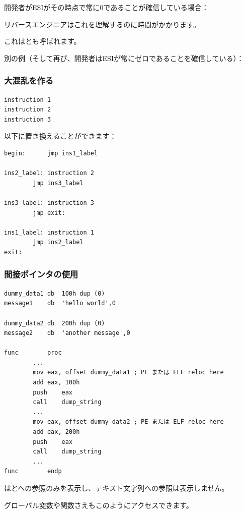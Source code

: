 開発者がESIがその時点で常に0であることが確信している場合：



リバースエンジニアはこれを理解するのに時間がかかります。

これはとも呼ばれます。

別の例（そして再び、開発者はESIが常にゼロであることを確信している）：



\subsubsection{大混乱を作る}

\begin{lstlisting}
instruction 1
instruction 2
instruction 3
\end{lstlisting}

以下に置き換えることができます：

\begin{lstlisting}[style=customasmx86]
begin:		jmp	ins1_label

ins2_label:	instruction 2
		jmp	ins3_label

ins3_label:	instruction 3
		jmp	exit:

ins1_label:	instruction 1
		jmp	ins2_label
exit:
\end{lstlisting}

\subsubsection{間接ポインタの使用}

\begin{lstlisting}[style=customasmx86]
dummy_data1	db	100h dup (0)
message1	db	'hello world',0

dummy_data2	db	200h dup (0)
message2	db	'another message',0

func		proc
		...
		mov	eax, offset dummy_data1 ; PE または ELF reloc here
		add	eax, 100h
		push	eax
		call	dump_string
		...
		mov	eax, offset dummy_data2 ; PE または ELF reloc here
		add	eax, 200h
		push	eax
		call	dump_string
		...
func		endp
\end{lstlisting}

\IDA{}はとへの参照のみを表示し、テキスト文字列への参照は表示しません。

グローバル変数や関数さえもこのようにアクセスできます。

